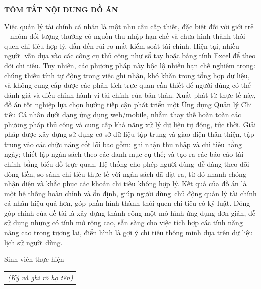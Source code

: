 \documentclass[../DoAn.tex]{subfiles}
\begin{document}
\begin{center}
    \Large{\textbf{TÓM TẮT NỘI DUNG ĐỒ ÁN}}\\
\end{center}
\vspace{1cm}
Việc quản lý tài chính cá nhân là một nhu cầu cấp thiết, đặc biệt đối với giới trẻ – nhóm đối tượng thường có nguồn thu nhập hạn chế và chưa hình thành thói quen chi tiêu hợp lý, dẫn đến rủi ro mất kiểm soát tài chính. Hiện tại, nhiều người vẫn dựa vào các công cụ thủ công như sổ tay hoặc bảng tính Excel để theo dõi chi tiêu. Tuy nhiên, các phương pháp này bộc lộ nhiều hạn chế nghiêm trọng: chúng thiếu tính tự động trong việc ghi nhận, khó khăn trong tổng hợp dữ liệu, và không cung cấp được các phân tích trực quan cần thiết để người dùng có thể đánh giá và điều chỉnh hành vi tài chính của bản thân. Xuất phát từ thực tế này, đồ án tốt nghiệp lựa chọn hướng tiếp cận phát triển một Ứng dụng Quản lý Chi tiêu Cá nhân dưới dạng ứng dụng web/mobile, nhằm thay thế hoàn toàn các phương pháp thủ công và cung cấp khả năng xử lý dữ liệu tự động, tức thời. Giải pháp được xây dựng sử dụng cơ sở dữ liệu tập trung và giao diện thân thiện, tập trung vào các chức năng cốt lõi bao gồm: ghi nhận thu nhập và chi tiêu hằng ngày; thiết lập ngân sách theo các danh mục cụ thể; và tạo ra các báo cáo tài chính bằng biểu đồ trực quan. Hệ thống cho phép người dùng dễ dàng theo dõi dòng tiền, so sánh chi tiêu thực tế với ngân sách đã đặt ra, từ đó nhanh chóng nhận diện và khắc phục các khoản chi tiêu không hợp lý. Kết quả của đồ án là một hệ thống hoàn chỉnh và ổn định, giúp người dùng chủ động quản lý tài chính cá nhân hiệu quả hơn, góp phần hình thành thói quen chi tiêu có kỷ luật. Đóng góp chính của đề tài là xây dựng thành công một mô hình ứng dụng đơn giản, dễ sử dụng nhưng có tính mở rộng cao, sẵn sàng cho việc tích hợp các tính năng nâng cao trong tương lai, điển hình là gợi ý chi tiêu thông minh dựa trên dữ liệu lịch sử người dùng.
\begin{flushright}
Sinh viên thực hiện\\
\begin{tabular}{@{}c@{}}
\textit{(Ký và ghi rõ họ tên)}
\end{tabular}
\end{flushright}
\end{document}
